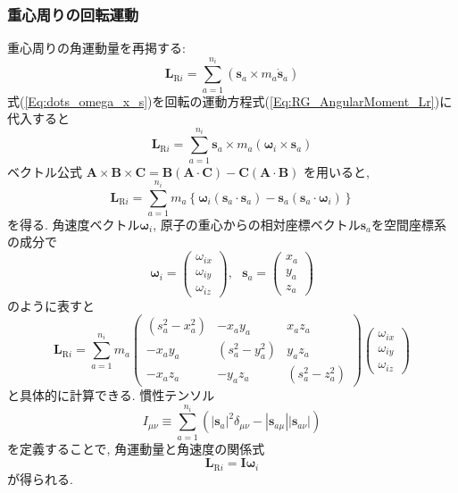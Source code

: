 \subsubsection{重心周りの回転運動}
重心周りの角運動量を再掲する:
\begin{equation}
  \bm{L}_{\mathrm{R}i}
  =
  \sum_{a=1}^{n_{i}} (\bm{s}_{a} \times m_{a} \dot{\bm{s}}_{a})
  \label{Eq:RG_AngularMoment_Lr}
\end{equation}
式(\ref{Eq:dots_omega_x_s})を回転の運動方程式(\ref{Eq:RG_AngularMoment_Lr})に代入すると
\begin{equation}
  \bm{L}_{\mathrm{R}i}
  =
  \sum_{a=1}^{n_{i}} \bm{s}_{a} \times m_{a} (\bm{\omega}_{i} \times \bm{s}_{a})
\end{equation}
ベクトル公式
$
  \bm{A} \times \bm{B} \times \bm{C}
  =
  \bm{B}(\bm{A} \cdot \bm{C}) -
  \bm{C}(\bm{A} \cdot \bm{B})
$
を用いると,
\begin{equation}
  \bm{L}_{\mathrm{R}i}
  =
  \sum_{a=1}^{n_{i}} m_{a}
  \left\{
    \bm{\omega}_{i} (\bm{s}_{a} \cdot \bm{s}_{a})
    -
    \bm{s}_{a} (\bm{s}_{a} \cdot \bm{\omega}_{i})
  \right\}
\end{equation}
を得る. 
角速度ベクトル$\bm{\omega}_{i}$, 原子の重心からの相対座標ベクトル$\bm{s}_{a}$を空間座標系の成分で
\begin{equation}
  \bm{\omega}_{i}
  =
  \begin{pmatrix}
    \omega_{ix} \\ \omega_{iy} \\ \omega_{iz}
  \end{pmatrix},~~~
  \bm{s}_{a}
  =
  \begin{pmatrix}
    x_{a} \\ y_{a} \\ z_{a}
  \end{pmatrix}
\end{equation}
のように表すと
\begin{equation}
  \bm{L}_{\mathrm{R}i}
  =
  \sum_{a=1}^{n_{i}} m_{a}
  \begin{pmatrix}
    (s_{a}^{2} - x_{a}^{2}) &
    -x_{a} y_{a} &
    x_{a} z_{a}  \\
    -x_{a} y_{a} &
    (s_{a}^{2} - y_{a}^{2}) &
     y_{a} z_{a} \\
    -x_{a} z_{a} &
    -y_{a} z_{a} &
    (s_{a}^{2} - z_{a}^{2})
  \end{pmatrix}
  \begin{pmatrix}
    \omega_{ix} \\ \omega_{iy} \\ \omega_{iz}
  \end{pmatrix}
\end{equation}
と具体的に計算できる. 慣性テンソル
\begin{equation}
  I_{\mu\nu}
  \equiv
  \sum_{a=1}^{n_{i}}
  ( |\bm{s}_{a}|^{2} \delta_{\mu \nu} - |\bm{s}_{a\mu}| |\bm{s}_{a\nu}|)
\end{equation}
を定義することで, 角運動量と角速度の関係式
\begin{equation}
  \bm{L}_{\mathrm{R}i}
  =
  \bm{I} \bm{\omega}_{i}
\end{equation}
が得られる.

